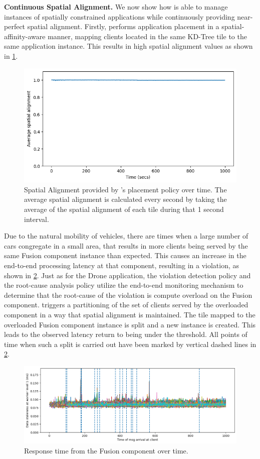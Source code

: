 \par \noindent \textbf{Continuous Spatial Alignment. } We now show how \oneedge{} is able to manage instances of spatially constrained applications while continuously providing near-perfect spatial alignment. Firstly, \oneedge{} performs application placement in a spatial-affinity-aware manner, mapping clients located in the same KD-Tree tile to the same application instance. This results in high spatial alignment values as shown in \cref{fig:mapfusion_spatial_alignment}.
\begin{figure}[ht]
  \centering
    \includegraphics[width=0.8\columnwidth]{figures/oneedge/spatial_alignment_vs_time.png}
    \caption{Spatial Alignment provided by \oneedge{}'s placement policy over time. The average spatial alignment is calculated every second by taking the average of the spatial alignment of each tile during that 1 second interval.}
    \label{fig:mapfusion_spatial_alignment}
\end{figure}
Due to the natural mobility of vehicles, there are times when a large number of cars congregate in a small area, that results in more clients being served by the same Fusion component instance than expected. This causes an increase in the end-to-end processing latency at that component, resulting in a violation, as shown in \cref{fig:mapfusion_latency}. Just as for the Drone application, the violation detection policy and the root-cause analysis policy utilize the end-to-end monitoring mechanism to determine that the root-cause of the violation is compute overload on the Fusion component. \oneedge{} triggers a partitioning of the set of clients served by the overloaded component in a way that spatial alignment is maintained. The tile mapped to the overloaded Fusion component instance is split and a new instance is created. This leads to the observed latency return to being under the threshold. All points of time when such a split is carried out have been marked by vertical dashed lines in \cref{fig:mapfusion_latency}.
\begin{figure}[ht]
  \centering
    \includegraphics[width=0.8\columnwidth]{figures/oneedge/mapfusion_latencies.png}
    \caption{Response time from the Fusion component over time.}
    \label{fig:mapfusion_latency}
\end{figure}

